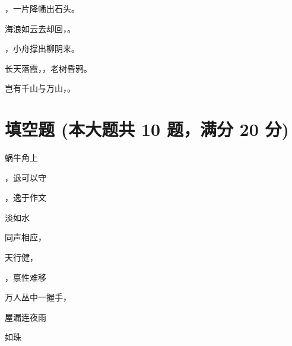 \documentclass[12pt, a4paper, addpoints, answers]{exam}
\begin{document}
\begin{questions}
\question[3] \fillin ，一片降幡出石头。

   

 

\question[3] 海浪如云去却回，\fillin[北风吹起数声雷] 。

   

 

\question[3] \fillin[春水断桥人不度] ，小舟撑出柳阴来。

   

 

\question[3] 长天落霞，\fillin ，老树昏鸦。

   

 

\question[3] 岂有千山与万山，\fillin 。

   

 
\end{questions}

\hspace{5cm}

\section{\normalsize{填空题 (本大题共 10 题，满分 20 分)}}
\hspace{1.5cm}
\begin{multicols}{2}
\begin{questions}
\question[2] 蜗牛角上\fillin[争何事] 

   

 

\question[2] \fillin[进可以攻] ，退可以守

   

 

\question[2] \fillin[劳于读书] ，逸于作文

   

 

\question[2] \fillin[君子之交] 淡如水

   

 

\question[2] 同声相应，\fillin[同气相求] 

   

 

\question[2] 天行健，\fillin[君子以自强不息] 

   

 

\question[2] \fillin[江山易改] ，禀性难移

   

 

\question[2] 万人丛中一握手，\fillin[使我衣袖三年香] 

   

 

\question[2] 屋漏\fillin[偏逢] 连夜雨

   

 

\question[2] \fillin 如珠

   

 
\end{questions}
\end{multicols}
\end{document}
